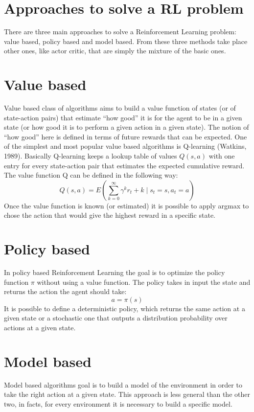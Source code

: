 \documentclass[Lau,oneside,noexaminfo]{sapthesis} %
\begin{document}
\section{Approaches to solve a RL problem}
There are three main approaches to solve a Reinforcement Learning problem: value based, policy based and model based. \newline
From these three methods take place other ones, like actor critic, that are simply the mixture of the basic ones.
\section{Value based}
Value based class of algorithms aims to build a value function of states (or of state-action pairs) that estimate “how good” it is for the agent to be in a given state (or how good it is to perform a given action in a given state). The notion of “how good” here is defined in terms of future rewards that can be expected. One of the simplest and most popular value based algorithms is Q-learning (Watkins, 1989). \newline
Basically Q-learning keeps a lookup table of values $Q(s,a)$ with one entry for every state-action pair that estimates the  expected cumulative reward. The value function Q can be defined in the following way:
\begin{equation}
Q( s,a ) = E( \sum_{k=0}^{\infty} \gamma^k r_t+k \mid s_t=s, a_t=a )
\end{equation}
Once the value function is known (or estimated) it is possible to apply argmax to chose the action that would give the highest reward in a specific state.
\section{Policy based}
In policy based Reinforcement Learning the goal is to optimize the policy function $\pi$ without using a value function. The policy takes in input the state and returns the action the agent should take:
\begin{equation}
a = \pi(s)
\end{equation}
It is possible to define a deterministic policy, which returns the same action at a given state or a stochastic one  that outputs a distribution probability over actions at a given state.
\section{Model based}
Model based algorithms goal is to build a model of the environment in order to take the right action at a given state. This approach is less general than the other two, in facts, for every environment it is necessary to build a specific model.
\end{document}
